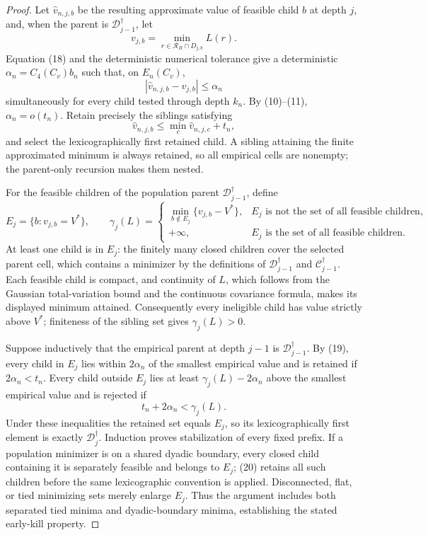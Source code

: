 \documentclass{article}
\begin{document}
\begin{proof}
Let \(\widehat v_{n,j,b}\) be the resulting approximate value of feasible child \(b\) at depth \(j\), and, when the parent is \(\mathcal D_{j-1}^\dagger\), let
\[
v_{j,b}=\min_{r\in\mathcal R_B\cap D_{j,b}}L(r).
\]
Equation (18) and the deterministic numerical tolerance give a deterministic \(\alpha_n=C_4(C_v)b_n\) such that, on \(E_n(C_v)\),
\[
|\widehat v_{n,j,b}-v_{j,b}|\le\alpha_n
\tag{19}
\]
simultaneously for every child tested through depth \(k_n\). By (10)--(11), \(\alpha_n=o(t_n)\). Retain precisely the siblings satisfying
\[
\widehat v_{n,j,b}\le\min_c\widehat v_{n,j,c}+t_n,
\tag{20}
\]
and select the lexicographically first retained child. A sibling attaining the finite approximated minimum is always retained, so all empirical cells are nonempty; the parent-only recursion makes them nested.

For the feasible children of the population parent \(\mathcal D_{j-1}^\dagger\), define
\[
E_j=\{b:v_{j,b}=V^*\},\qquad
\gamma_j(L)=
\begin{cases}
\min_{b\notin E_j}\{v_{j,b}-V^*\},&
E_j\text{ is not the set of all feasible children},\\
+\infty,&E_j\text{ is the set of all feasible children}.
\end{cases}
\tag{21}
\]
At least one child is in \(E_j\): the finitely many closed children cover the selected parent cell, which contains a minimizer by the definitions of \(\mathcal D_{j-1}^\dagger\) and \(\mathcal C_{j-1}^\dagger\). Each feasible child is compact, and continuity of \(L\), which follows from the Gaussian total-variation bound and the continuous covariance formula, makes its displayed minimum attained. Consequently every ineligible child has value strictly above \(V^*\); finiteness of the sibling set gives \(\gamma_j(L)>0\).

Suppose inductively that the empirical parent at depth \(j-1\) is \(\mathcal D_{j-1}^\dagger\). By (19), every child in \(E_j\) lies within \(2\alpha_n\) of the smallest empirical value and is retained if \(2\alpha_n<t_n\). Every child outside \(E_j\) lies at least \(\gamma_j(L)-2\alpha_n\) above the smallest empirical value and is rejected if
\[
t_n+2\alpha_n<\gamma_j(L).
\tag{22}
\]
Under these inequalities the retained set equals \(E_j\), so its lexicographically first element is exactly \(\mathcal D_j^\dagger\). Induction proves stabilization of every fixed prefix. If a population minimizer is on a shared dyadic boundary, every closed child containing it is separately feasible and belongs to \(E_j\); (20) retains all such children before the same lexicographic convention is applied. Disconnected, flat, or tied minimizing sets merely enlarge \(E_j\). Thus the argument includes both separated tied minima and dyadic-boundary minima, establishing the stated early-kill property.


\end{proof}
\end{document}
